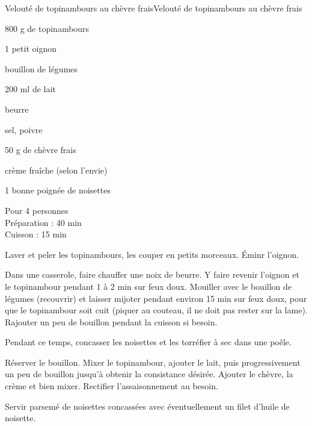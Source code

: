\begin{recette}{Velouté de topinambours au chèvre frais}{Velouté de topinambours au chèvre frais}

\begin{ingredients}
800 g de topinambours\par
1 petit oignon\par
bouillon de légumes\par
200 ml de lait\par
beurre\par
sel, poivre\par
50 g de chèvre frais\par
crème fraîche (selon l'envie)\par
1 bonne poignée de noisettes\par
\end{ingredients}

\begin{infos}
Pour 4 personnes\\
Préparation : 40 min\\
Cuisson : 15 min\\
\end{infos}

\begin{etapes}
\item Laver et peler les topinambours, les couper en petits morceaux. Éminr l'oignon.
\item Dans une casserole, faire chauffer une noix de beurre. Y faire revenir l'oignon et le topinambour pendant 1 à 2 min sur feux doux. Mouiller avec le bouillon de légumes (recouvrir) et laisser mijoter pendant environ 15 min sur feux doux, pour que le topinambour soit cuit (piquer au couteau, il ne doit pas rester sur la lame). Rajouter un peu de bouillon pendant la cuisson si besoin.
\item Pendant ce temps, concasser les noisettes et les torréfier à sec dans une poêle.
\item Réserver le bouillon. Mixer le topinambour, ajouter le lait, puis progressivement un peu de bouillon jusqu'à obtenir la consistance désirée. Ajouter le chèvre, la crème et bien mixer. Rectifier l'assaisonnement au besoin.
\item Servir parsemé de noisettes concassées avec éventuellement un filet d'huile de noisette.
\end{etapes}

\end{recette}